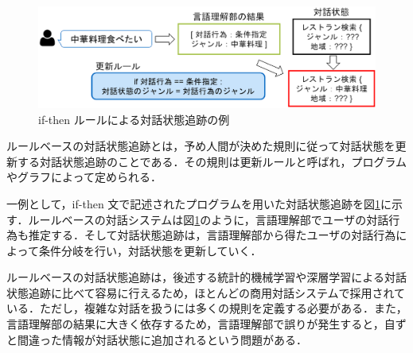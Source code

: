 \begin{figure}[thb]
  \centering
  \includegraphics[width=15cm]{chapter2/rulebase.eps}
  \caption{if-then ルールによる対話状態追跡の例}
  \label{fig:rulebase}
\end{figure}

ルールベースの対話状態追跡とは，予め人間が決めた規則に従って対話状態を更新する対話状態追跡のことである．その規則は更新ルールと呼ばれ，プログラムやグラフによって定められる．
\par
一例として，if-then 文で記述されたプログラムを用いた対話状態追跡を図\ref{fig:rulebase}に示す．ルールベースの対話システムは図\ref{fig:rulebase}のように，言語理解部でユーザの対話行為も推定する．そして対話状態追跡は，言語理解部から得たユーザの対話行為によって条件分岐を行い，対話状態を更新していく．
\par
ルールベースの対話状態追跡は，後述する統計的機械学習や深層学習による対話状態追跡に比べて容易に行えるため，ほとんどの商用対話システムで採用されている．ただし，複雑な対話を扱うには多くの規則を定義する必要がある．また，言語理解部の結果に大きく依存するため，言語理解部で誤りが発生すると，自ずと間違った情報が対話状態に追加されるという問題がある\cite{rule_base}．